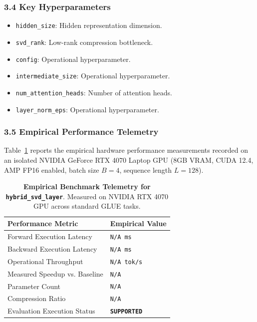 \subsubsection*{3.4 Key Hyperparameters}
\begin{itemize}
    \item \texttt{hidden\_size}: Hidden representation dimension.
    \item \texttt{svd\_rank}: Low-rank compression bottleneck.
    \item \texttt{config}: Operational hyperparameter.
    \item \texttt{intermediate\_size}: Operational hyperparameter.
    \item \texttt{num\_attention\_heads}: Number of attention heads.
    \item \texttt{layer\_norm\_eps}: Operational hyperparameter.
\end{itemize}

\subsubsection*{3.5 Empirical Performance Telemetry}
Table~\ref{tab:telemetry_hybrid\_svd\_layer} reports the empirical hardware performance measurements recorded on an isolated NVIDIA GeForce RTX 4070 Laptop GPU (8GB VRAM, CUDA 12.4, AMP FP16 enabled, batch size $B=4$, sequence length $L=128$).

\begin{table}[h]
\centering
\small
\caption{\textbf{Empirical Benchmark Telemetry for \texttt{hybrid\_svd\_layer}}. Measured on NVIDIA RTX 4070 GPU across standard GLUE tasks.}
\label{tab:telemetry_hybrid\_svd\_layer}
\begin{tabularx}{\columnwidth}{lX}
\toprule
\textbf{Performance Metric} & \textbf{Empirical Value} \\
\midrule
Forward Execution Latency & \texttt{N/A ms} \\
Backward Execution Latency & \texttt{N/A ms} \\
Operational Throughput & \texttt{N/A tok/s} \\
Measured Speedup vs. Baseline & \texttt{N/A} \\
Parameter Count & \texttt{N/A} \\
Compression Ratio & \texttt{N/A} \\
Evaluation Execution Status & \textbf{\texttt{SUPPORTED}} \\
\bottomrule
\end{tabularx}
\end{table}

